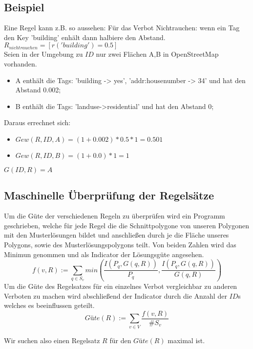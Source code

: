\subsection{Beispiel}
Eine Regel kann z.B. so aussehen:
Für das Verbot Nichtrauchen: wenn ein Tag den Key 'building' enhält dann halbiere den Abstand. \\
$R_{nichtrauchen} = [r('building') = 0.5]$\\
\newline
Seien in der Umgebung zu $ID$ nur zwei Flächen A,B in OpenStreetMap vorhanden.
\begin{itemize}
\item A enthält die Tags: 'building -> yes', 'addr:housenumber -> 34' und hat den Abstand 0.002;
\item B enthält die Tags: 'landuse->residential' und hat den Abstand 0;
\end{itemize}
Daraus errechnet sich:
\begin{itemize}
\item $Gew(R,ID,A) = (1+0.002) * 0.5 * 1 = 0.501$
\item $Gew(R,ID,B) = (1+0.0) * 1 = 1$
\end{itemize}

$G(ID,R) = A$

\subsection{Maschinelle Überprüfung der Regelsätze}
Um die Güte der verschiedenen Regeln zu überprüfen wird ein Programm geschrieben, welche für jede Regel die die Schnittpolygone von unseren Polygonen mit
den Musterlösungen bildet und anschließen durch je die Fläche unseres Polygons, sowie des Musterlösungspolygons teilt.
Von beiden Zahlen wird das Minimun genommen und als Indicator der Lösungsgüte angesehen.\\
\begin{equation}
f(v,R) := \sum_{q\in S_v} min(\frac{I(P_q,G(q,R))}{P_q},\frac{I(P_q,G(q,R))}{G(q,R)})
\end{equation}
Um die Güte des Regelsatzes für ein einzelnes Verbot vergleichbar zu anderen Verboten zu machen wird abschließend der Indicator durch
die Anzahl der $ID$s welches es beeinflussen geteilt.\\
\begin{equation}
\label{eq:guete}
Güte(R) := \sum_{v \in V} \frac{ f(v,R)}{\#S_v}
\end{equation}

Wir suchen also einen Regelsatz $R$ für den $Güte(R)$ maximal ist.


